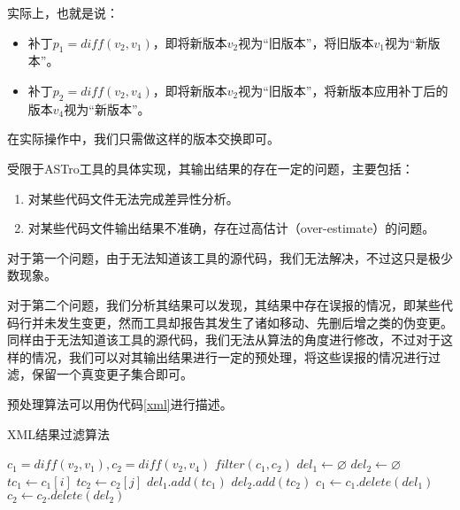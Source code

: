 实际上，也就是说：
\begin{itemize}
	\item 补丁$p_1 = diff(v_2,v_1)$，即将新版本$v_2$视为“旧版本”，将旧版本$v_1$视为“新版本”。
	\item 补丁$p_2 = diff(v_2,v_4)$，即将新版本$v_2$视为“旧版本”，将新版本应用补丁后的版本$v_4$视为“新版本”。
\end{itemize}

在实际操作中，我们只需做这样的版本交换即可。

受限于ASTro工具的具体实现，其输出结果的存在一定的问题，主要包括：
\begin{enumerate}
	\item 对某些代码文件无法完成差异性分析。
	\item 对某些代码文件输出结果不准确，存在过高估计（over-estimate）的问题。
\end{enumerate}

对于第一个问题，由于无法知道该工具的源代码，我们无法解决，不过这只是极少数现象。

对于第二个问题，我们分析其结果可以发现，其结果中存在误报的情况，即某些代码行并未发生变更，然而工具却报告其发生了诸如移动、先删后增之类的伪变更。同样由于无法知道该工具的源代码，我们无法从算法的角度进行修改，不过对于这样的情况，我们可以对其输出结果进行一定的预处理，将这些误报的情况进行过滤，保留一个真变更子集合即可。

预处理算法可以用伪代码\ref {xml}进行描述。

\begin{algorithm}
	\caption{XML结果过滤算法}
	\label{xml}
	\begin{algorithmic}[1]
		  \REQUIRE $c_1 = diff(v_2, v_1), c_2 = diff(v_2,v_4)$
		  \ENSURE $filter(c_1, c_2)$
		  \STATE $del_1 \gets \varnothing$
		  \STATE $del_2 \gets \varnothing$
			  \STATE $tc_1 \gets c_1[i]$
				  \STATE $tc_2 \gets c_2[j]$
					  \STATE $del_1.add(tc_1)$
					  \STATE $del_2.add(tc_2)$
				  \ENDIF	
			  \ENDFOR
		 \ENDFOR
		 \STATE $c_1 \gets c_1.delete(del_1)$
		 \STATE $c_2 \gets c_2.delete(del_2)$
	\end{algorithmic}
\end{algorithm}

